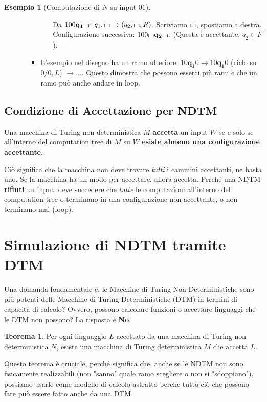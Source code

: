 \documentclass[a4paper]{article}
\theoremstyle{definition} %
\newtheorem{theorem}{Teorema}
\newtheorem{example}{Esempio}
\newcommand{\blankS}{\ensuremath{\raisebox{-0.15ex}{\scalebox{1.3}[0.7]{$\sqcup$}}}}
\begin{document}
\begin{example}[Computazione di $N$ su input $01$]
\begin{enumerate}
\begin{itemize}
\begin{itemize}
\begin{itemize}
                Da $100\mathbf{q_1}\blankS$: $q_1,\blankS \to (q_2,\blankS,R)$. Scriviamo $\blankS$, spostiamo a destra.\\
                Configurazione successiva: $100\blankS\mathbf{q_2}\blankS$. (Questa è accettante, $q_2 \in F$).
            \end{itemize}
            \item L'esempio nel disegno ha un ramo ulteriore: $10\mathbf{q_1}0 \to 10\mathbf{q_1}0$ (ciclo su $0/0,L$) $\to \dots$. Questo dimostra che possono esserci più rami e che un ramo può anche andare in loop.
        \end{itemize}
    \end{itemize}

\end{enumerate}
\end{example}

\subsection{Condizione di Accettazione per NDTM}

Una macchina di Turing non deterministica $M$ \textbf{accetta} un input $W$ se e solo se all'interno del computation tree di $M$ su $W$ \textbf{esiste almeno una configurazione accettante}.

Ciò significa che la macchina non deve trovare \emph{tutti} i cammini accettanti, ne basta uno. Se la macchina ha un modo per accettare, allora accetta.
Perché una NDTM \textbf{rifiuti} un input, deve succedere che \emph{tutte} le computazioni all'interno del computation tree o terminano in una configurazione non accettante, o non terminano mai (loop).

\section{Simulazione di NDTM tramite DTM}

Una domanda fondamentale è: le Macchine di Turing Non Deterministiche sono più potenti delle Macchine di Turing Deterministiche (DTM) in termini di capacità di calcolo? Ovvero, possono calcolare funzioni o accettare linguaggi che le DTM non possono? La risposta è \textbf{No}.

\begin{theorem}
Per ogni linguaggio $L$ accettato da una macchina di Turing non deterministica $N$, esiste una macchina di Turing deterministica $M$ che accetta $L$.
\end{theorem}
Questo teorema è cruciale, perché significa che, anche se le NDTM non sono fisicamente realizzabili (non "sanno" quale ramo scegliere o non si "sdoppiano"), possiamo usarle come modello di calcolo astratto perché tutto ciò che possono fare può essere fatto anche da una DTM.
\end{document}
